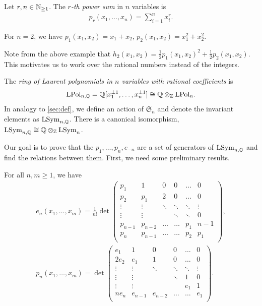 \documentclass[11pt]{amsart}
\begin{document}
\begin{defin}
Let $r,n \in \mathbb{N}_{\geq 1}$. The \emph{$r$-th power sum} in $n$ variables is 
\begin{align}
    p_r(x_1, \dots, x_n)=\sum_{i=1}^n x_i^r. 
\end{align}
\end{defin}

\begin{eg} For $n=2$, we have $p_1(x_1, x_2)=x_1+x_2$, $p_2(x_1, x_2)=x_1^2+x_2^2$. 
\end{eg}
Note from the above example that $h_2(x_1, x_2)=\frac{1}{2}p_1(x_1, x_2)^2+\frac{1}{2}p_2(x_1, x_2)$. This motivates us to work over the rational numbers instead of the integers.
\begin{defin}
    The \emph{ring of Laurent polynomials in \(n\) variables with rational coefficients} is 
    \[
    \mathrm{LPol}_{n,\mathbb{Q}} = \mathbb{Q} [x_1^{\pm 1},\dots, x_n^{\pm 1}] \cong \mathbb{Q} \otimes_{\mathbb{Z}} \mathrm{LPol}_{n}.
    \]
    In analogy to \cref{sec:def}, we define an action of \(\mathfrak{S}_n\) and denote the invariant elements as \(\mathrm{LSym}_{n,\mathbb{Q}}\). There is a canonical isomorphism, \(\mathrm{LSym}_{n,\mathbb{Q}} \cong \mathbb{Q} \otimes_{\mathbb{Z}} \mathrm{LSym}_n\).
\end{defin}

Our goal is to prove that the \(p_1,\dots,p_n,e_{-n}\) are a set of generators of \(\mathrm{LSym}_{n,\mathbb{Q}}\) and find the relations between them. First, we need some preliminary results.

\begin{lem} \label{lem:endetp}
    For all $n,m \geq 1$, we have
    \begin{gather}
    e_n(x_1,\dots,x_m) = \frac{1}{n!}\det\begin{pmatrix}
        p_1 & 1 & 0 & 0 & \dots & 0\\
        p_2 & p_1 & 2  & 0 & \dots & 0\\
        \vdots & \vdots & \ddots & \ddots & \ddots & \vdots\\
        \vdots & \vdots &  & \ddots & \ddots & 0 \\
        p_{n-1} & p_{n -2} & \dots & \dots & p_1 & n-1 \\
        p_n & p_{n-1} & \dots & \dots & p_2 & p_1 \\
    \end{pmatrix}, \label{eq:er-pr}
    \\
    p_n (x_1,\dots,x_m)= \det\begin{pmatrix}
        e_1 & 1 & 0& 0 & \dots &0\\2e_2 & e_1 & 1 & 0& \dots & 0\\
        \vdots & \vdots & \ddots & \ddots &\ddots & \vdots \\
        \vdots &  \vdots &&\ddots & 1 & 0\\
        \vdots & \vdots &&&e_1 & 1\\
        ne_n & e_{n-1} & e_{n-2} &\dots &\dots& e_1\\
    \end{pmatrix}. \label{eq:pr-er}
    \end{gather}
\end{lem}
\end{document}
